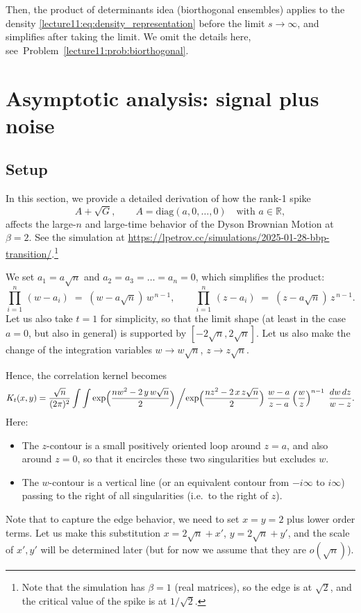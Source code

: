 \documentclass[letterpaper,11pt,oneside,reqno]{book}
\numberwithin{equation}{chapter}  %
\theoremstyle{definition}
\begin{document}
Then, the product of determinants idea
(biorthogonal ensembles)
applies
to the density \eqref{lecture11:eq:density_representation}
before the limit $s\to\infty$,
and simplifies after taking the limit.
We omit the details here,
see~Problem~\ref{lecture11:prob:biorthogonal}.


\section{Asymptotic analysis: signal plus noise}

\subsection{Setup}

\label{lecture11:sec:rank1-spike-detailed}
In this section, we provide a detailed derivation of how the rank-1 spike
\[
	A+\sqrt G,\qquad
A = \mathrm{diag}(a,0,\dots,0)
\quad\text{with }a\in\mathbb{R},
\]
affects the large-$n$ and large-time behavior of the Dyson Brownian Motion at $\beta=2$.
See the simulation at
\url{https://lpetrov.cc/simulations/2025-01-28-bbp-transition/}.\footnote{Note
that the simulation has $\beta=1$ (real matrices),
so the edge is at $\sqrt 2$, and the critical
value of the spike is at $1/\sqrt 2$.}

We set $a_1=a\sqrt n$ and $a_2=a_3=\dots=a_n=0$, which simplifies the product:
\[
\prod_{i=1}^n\,(w - a_i)\;=\;(w-a\sqrt n)\,w^{\,n-1},
\qquad
\prod_{i=1}^n\,(z - a_i)\;=\;(z-a\sqrt n)\,z^{\,n-1}.
\]
Let us also take $t=1$ for simplicity,
so that the limit shape (at least in the case $a=0$, but also in general)
is supported by $[-2\sqrt n,2\sqrt n]$.
Let us also make the change of the integration variables $w\to w\sqrt n$,
$z\to z\sqrt n$.

Hence, the correlation kernel becomes
\begin{equation}
\label{lecture11:eq:K_t_a_expanded}
K_t(x,y)
=
\frac{\sqrt n}{(2\pi)^2}
\int \int
\exp\Bigl(\frac{nw^2 - 2\,y\,w\sqrt n}{2}\Bigr)\,
\biggl/
\exp\Bigl(\frac{nz^2 - 2\,x\,z\sqrt n}{2}\Bigr)
\;\frac{w - a}{z - a}
\left( \frac{w}{z} \right)^{n-1}
\;\frac{dw\,dz}{w - z}.
\end{equation}
Here:
\begin{itemize}
\item The $z$-contour is a small positively oriented loop around $z=a$, and also around $z=0$, so that it encircles these two singularities but excludes $w$.
\item The $w$-contour is a vertical line (or an equivalent contour from $-i\infty$ to $i\infty$) passing to the right of all singularities (i.e.\ to the right of $z$).
\end{itemize}
Note that to capture the edge behavior, we need to set $x=y=2$ plus lower order terms.
Let us make this substitution $x=2\sqrt n+x'$, $y=2\sqrt n+y'$, and the
scale of $x',y'$ will be determined later (but for now we assume that they are
$o(\sqrt n)$).
\end{document}
